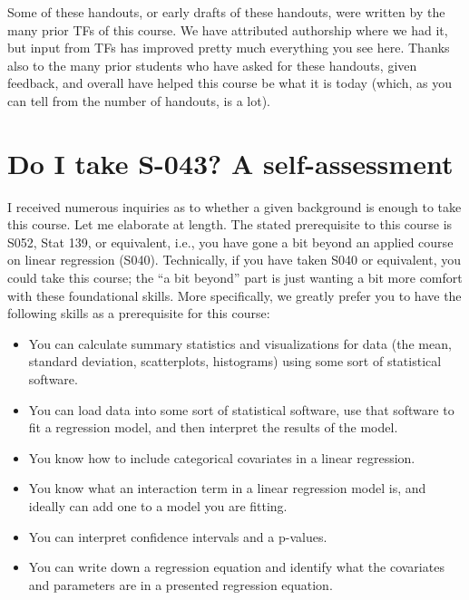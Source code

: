 \documentclass[
  letterpaper,
  DIV=11,
  numbers=noendperiod]{scrreprt}
\begin{document}

Some of these handouts, or early drafts of these handouts, were written
by the many prior TFs of this course. We have attributed authorship
where we had it, but input from TFs has improved pretty much everything
you see here. Thanks also to the many prior students who have asked for
these handouts, given feedback, and overall have helped this course be
what it is today (which, as you can tell from the number of handouts, is
a lot).


\hypertarget{do-i-take-s-043-a-self-assessment}{%
\chapter*{Do I take S-043? A
self-assessment}\label{do-i-take-s-043-a-self-assessment}}


I received numerous inquiries as to whether a given background is enough
to take this course. Let me elaborate at length. The stated prerequisite
to this course is S052, Stat 139, or equivalent, i.e., you have gone a
bit beyond an applied course on linear regression (S040). Technically,
if you have taken S040 or equivalent, you could take this course; the
``a bit beyond'' part is just wanting a bit more comfort with these
foundational skills. More specifically, we greatly prefer you to have
the following skills as a prerequisite for this course:

\begin{itemize}
\item
  You can calculate summary statistics and visualizations for data (the
  mean, standard deviation, scatterplots, histograms) using some sort of
  statistical software.
\item
  You can load data into some sort of statistical software, use that
  software to fit a regression model, and then interpret the results of
  the model.
\item
  You know how to include categorical covariates in a linear regression.
\item
  You know what an interaction term in a linear regression model is, and
  ideally can add one to a model you are fitting.
\item
  You can interpret confidence intervals and a p-values.
\item
  You can write down a regression equation and identify what the
  covariates and parameters are in a presented regression equation.
\end{itemize}
\end{document}
